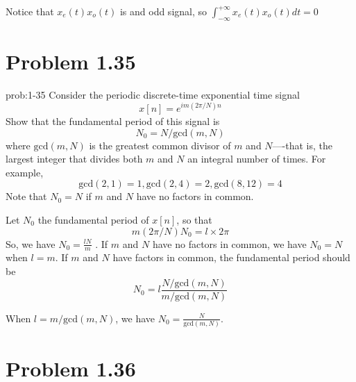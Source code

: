 \documentclass[koma,a4paper,utopia,12pt,listings-color,microtype,paralist,colorlinks,urlcolor=red]{org-article}
\begin{document}
Notice that \(x_{e}(t)x_{o}(t)\) is and odd signal, so \(\int_{-\infty}^{+\infty} x_{e}(t)x_{o}(t) dt = 0\)
\section{Problem 1.35}
\label{sec:orgd2ae89c}


\begin{prob}[]{prob:1-35}
Consider the periodic discrete-time exponential time signal
\begin{equation*}
x[n] = e^{im(2\pi/N)n}
\end{equation*}
Show that the fundamental period of this signal is
\begin{equation*}
N_{0} = N / \mathrm{gcd}(m,N)
\end{equation*}
where \(\mathrm{gcd}(m,N)\) is the greatest common divisor of \(m\) and
\(N\)----that is, the largest integer that divides both \(m\) and \(N\) an
integral number of times. For example,
\begin{equation*}
\mathrm{gcd}(2,1) = 1, \mathrm{gcd}(2,4) = 2, \mathrm{gcd}(8,12) = 4
\end{equation*}
Note that \(N_{0} = N\) if \(m\) and \(N\) have no factors in common.
\label{prob:1-35}
\end{prob}

\begin{prf}[]{}
Let \(N_{0}\) the fundamental period of \(x[n]\), so that
\begin{equation*}
m(2\pi / N) N_{0} = l\times 2\pi
\end{equation*}
So, we have \(N_{0} = \frac{lN}{m}\) . If \(m\) and \(N\) have no factors in
common, we have \(N_{0} = N\) when \(l = m\). If \(m\) and \(N\) have factors in
common, the fundamental period should be
\begin{equation*}
N_{0} = l \frac{N/ \mathrm{gcd}(m,N) }{m/ \mathrm{gcd}(m,N)}
\end{equation*}

When \(l = m/ \mathrm{gcd}(m,N)\), we have \(N_{0} = \frac{N}{ \mathrm{gcd}(m,N) }\).
\end{prf}
\section{Problem 1.36}
\label{sec:org4a7f30f}
\end{document}
